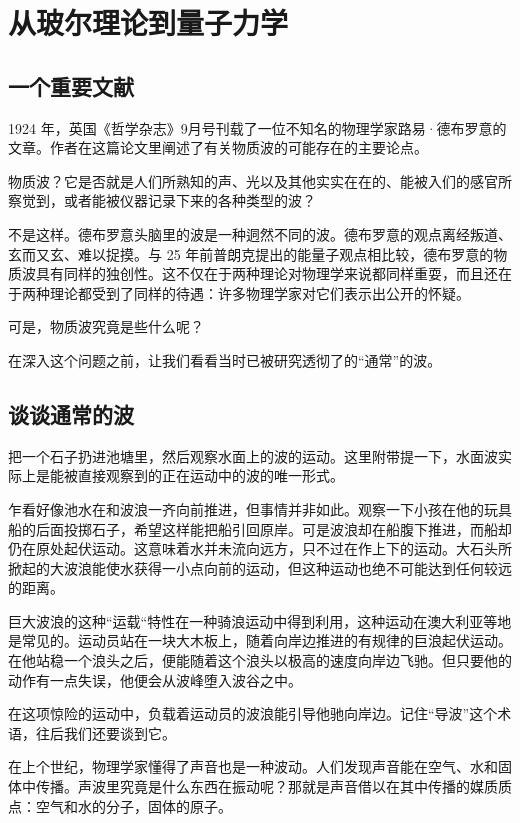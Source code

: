 \chapter{从玻尔理论到量子力学}

\section{一个重要文献}

1924 年，英国《哲学杂志》9月号刊载了一位不知名的物理学家路易·德布罗意的文章。作者在这篇论文里阐述了有关物质波的可能存在的主要论点。

物质波？它是否就是人们所熟知的声、光以及其他实实在在的、能被入们的感官所察觉到，或者能被仪器记录下来的各种类型的波？

不是这样。德布罗意头脑里的波是一种迵然不同的波。德布罗意的观点离经叛道、玄而又玄、难以捉摸。与 25 年前普朗克提出的能量子观点相比较，德布罗意的物质波具有同样的独创性。这不仅在于两种理论对物理学来说都同样重耍，而且还在于两种理论都受到了同样的待遇：许多物理学家对它们表示出公开的怀疑。

可是，物质波究竟是些什么呢？

在深入这个问题之前，让我们看看当时已被研究透彻了的“通常”的波。

\section{谈谈通常的波}

把一个石子扔进池塘里，然后观察水面上的波的运动。这里附带提一下，水面波实际上是能被直接观察到的正在运动中的波的唯一形式。

乍看好像池水在和波浪一齐向前推进，但事情并非如此。观察一下小孩在他的玩具船的后面投掷石子，希望这样能把船引回原岸。可是波浪却在船腹下推进，而船却仍在原处起伏运动。这意味着水并未流向远方，只不过在作上下的运动。大石头所掀起的大波浪能使水获得一小点向前的运动，但这种运动也绝不可能达到任何较远的距离。

巨大波浪的这种“运载“特性在一种骑浪运动中得到利用，这种运动在澳大利亚等地是常见的。运动员站在一块大木板上，随着向岸边推进的有规律的巨浪起伏运动。在他站稳一个浪头之后，便能随着这个浪头以极高的速度向岸边飞驰。但只要他的动作有一点失误，他便会从波峰堕入波谷之中。

在这项惊险的运动中，负载着运动员的波浪能引导他驰向岸边。记住“导波”这个术语，往后我们还要谈到它。

在上个世纪，物理学家懂得了声音也是一种波动。人们发现声音能在空气、水和固体中传播。声波里究竟是什么东西在振动呢？那就是声音借以在其中传播的媒质质点：空气和水的分子，固体的原子。

